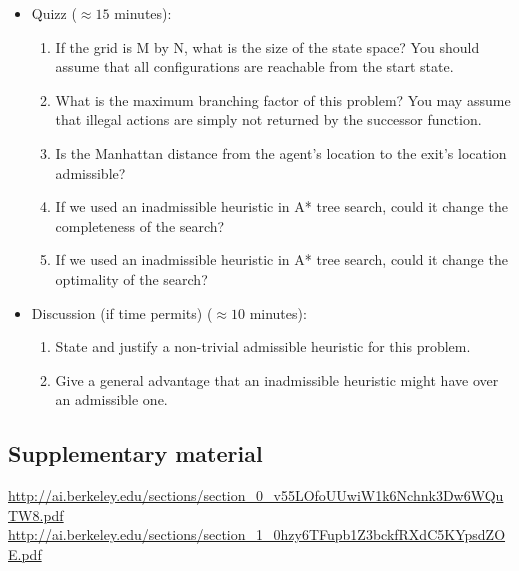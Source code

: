 \documentclass[a4paper, 10pt]{article}
\begin{document}
\begin{itemize}
    \item Quizz ($\approx 15$ minutes):
    \begin{enumerate}
    \item If the grid is M by N, what is the size of the state space? You should assume that all configurations are reachable from the start state. 
    \item What is the maximum branching factor of this problem? You may assume that illegal actions are simply not returned by the successor function.
    \item Is the Manhattan distance from the agent’s location to the exit’s location admissible?
    \item If we used an inadmissible heuristic in A* tree search, could it change the completeness of the search?
    \item If we used an inadmissible heuristic in A* tree search, could it change the optimality of the search?
    \end{enumerate}
    \item Discussion (if time permits) ($\approx 10$ minutes):
    \begin{enumerate}
        \item State and justify a non-trivial admissible heuristic for this problem.
        \item Give a general advantage that an inadmissible heuristic might have over an admissible one.
    \end{enumerate}
\end{itemize}
   \subsection{Supplementary material}
   \url{http://ai.berkeley.edu/sections/section_0_v55LOfoUUwiW1k6Nchnk3Dw6WQuTW8.pdf}\\
   \url{http://ai.berkeley.edu/sections/section_1_0hzy6TFupb1Z3bckfRXdC5KYpsdZOE.pdf}\\
\end{document}
